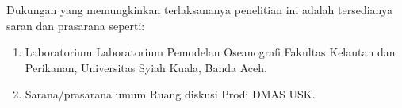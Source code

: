 Dukungan yang memungkinkan terlaksananya penelitian ini adalah tersedianya saran dan prasarana seperti:
\begin{enumerate}
	\item Laboratorium
	Laboratorium Pemodelan Oseanografi Fakultas Kelautan dan Perikanan, Universitas Syiah Kuala, Banda Aceh.
	\item Sarana/prasarana umum
	Ruang diskusi Prodi DMAS USK.
\end{enumerate}